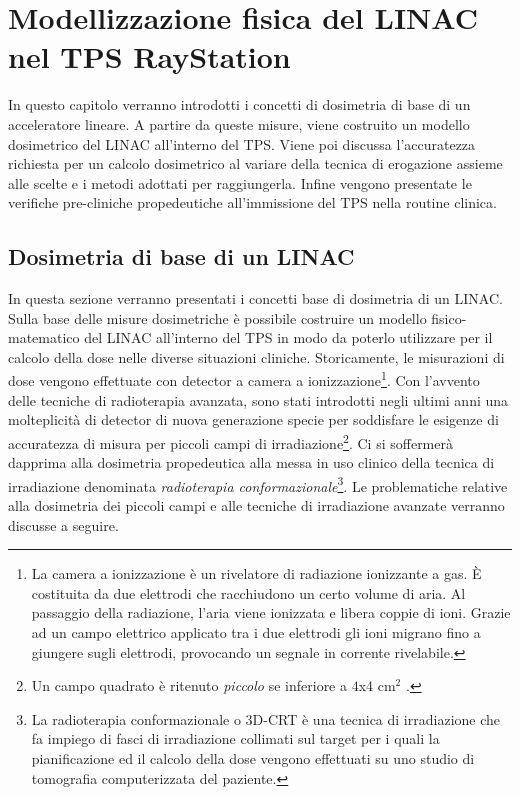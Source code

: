 \chapter{Modellizzazione f{}isica del LINAC nel TPS RayStation}
\minitoc
\textsf{In questo capitolo verranno introdotti i concetti di dosimetria di base di un acceleratore lineare. A partire da queste misure, viene costruito un modello dosimetrico del LINAC all'interno del TPS. Viene poi discussa l'accuratezza richiesta per un calcolo dosimetrico al variare della tecnica di erogazione assieme alle scelte e i metodi adottati per raggiungerla. Infine vengono presentate le verifiche pre-cliniche propedeutiche all'immissione del TPS nella routine clinica.}



\section{Dosimetria di base di un LINAC}

In questa sezione verranno presentati i concetti base di dosimetria di un LINAC. Sulla base delle misure dosimetriche è possibile costruire un modello fisico-matematico del LINAC all'interno del TPS in modo da poterlo utilizzare per il calcolo della dose nelle diverse situazioni cliniche. Storicamente, le misurazioni di dose vengono effettuate con detector a camera a ionizzazione\footnote{La camera a ionizzazione è un rivelatore di radiazione ionizzante a gas. \`E costituita da due elettrodi che racchiudono un certo volume di aria. Al passaggio della radiazione, l'aria viene ionizzata e libera coppie di ioni. Grazie ad un campo elettrico applicato tra i due elettrodi gli ioni migrano fino a giungere sugli elettrodi, provocando un segnale in corrente rivelabile.}. Con l'avvento delle tecniche di radioterapia avanzata, sono stati introdotti negli ultimi anni una molteplicità di detector di nuova generazione specie per soddisfare le esigenze di accuratezza di misura per piccoli campi di irradiazione\footnote{Un campo quadrato è ritenuto \textit{piccolo} se inferiore a $4$x$4$ cm$^2$ \cite{Das2008}.}. Ci si soffermerà dapprima alla dosimetria propedeutica alla messa in uso clinico della tecnica di irradiazione denominata \textit{radioterapia conformazionale}\footnote{La radioterapia conformazionale o 3D-CRT è una tecnica di irradiazione che  fa impiego di fasci di irradiazione collimati sul target per i quali la pianificazione ed il calcolo della dose vengono effettuati su uno studio di tomografia computerizzata del paziente.}. Le problematiche relative alla dosimetria dei piccoli campi e alle tecniche di irradiazione avanzate verranno discusse a seguire. 

